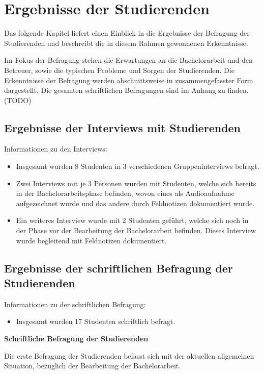 \documentclass{scrreprt}
\begin{document}
\newpage
\section{Ergebnisse der Studierenden}
\par Das folgende Kapitel liefert einen Einblick in die Ergebnisse der Befragung der Studierenden und beschreibt die in diesem Rahmen gewonnenen Erkenntnisse.
\par Im Fokus der Befragung stehen die Erwartungen an die Bachelorarbeit und den Betreuer, sowie die typischen Probleme und Sorgen der Studierenden. Die Erkenntnisse der Befragung werden abschnittsweise in zusammengefasster Form dargestellt. Die gesamten schriftlichen Befragungen sind im Anhang zu finden. (TODO) 

\subsection{Ergebnisse der Interviews mit Studierenden}
\par Informationen zu den Interviews:
\begin{itemize}
\item Insgesamt wurden 8 Studenten in 3 verschiedenen Gruppeninterviews befragt.
\item Zwei Interviews mit je 3 Personen wurden mit Studenten, welche sich bereits in der Bachelorarbeitsphase befinden, wovon eines als Audioaufnahme aufgezeichnet wurde und das andere durch Feldnotizen dokumentiert wurde.
\item Ein weiteres Interview wurde mit 2 Studenten geführt, welche sich noch in der Phase vor der Bearbeitung der Bachelorarbeit befinden. Dieses Interview wurde begleitend mit Feldnotizen dokumentiert.
\end{itemize}

\subsection{Ergebnisse der schriftlichen Befragung der Studierenden}
\par Informationen zu der schriftlichen Befragung:
\begin{itemize}
\item Insgesamt wurden 17 Studenten schriftlich befragt.
\end{itemize}

\par \textbf{Schriftliche Befragung der Studierenden}
\par Die erste Befragung der Studierenden befasst sich mit der aktuellen allgemeinen Situation, bezüglich der Bearbeitung der Bachelorarbeit.\\
\end{document}
